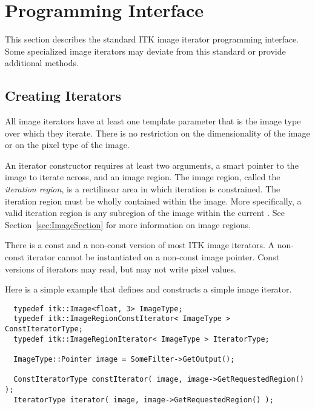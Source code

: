 \section{Programming Interface}
\label{sec:IteratorsInterface}

This section describes the standard ITK image iterator programming interface.
Some specialized image iterators may deviate from this standard or provide
additional methods.

\subsection{Creating Iterators}
\label{sec:CreatingIterators}

All image iterators have at least one template parameter that is the image
type over which they iterate.  There is no restriction on the dimensionality
of the image or on the pixel type of the image.


An iterator constructor requires at least two arguments, a smart pointer to the
image to iterate across, and an image region. The image region, called the
\emph{iteration region}, is a rectilinear area in which iteration is
constrained.  The iteration region must be wholly contained within the image.
More specifically, a valid iteration region is any subregion of the image
within the current .  See Section~\ref{sec:ImageSection}
for more information on image regions.

There is a const and a non-const version of most ITK image iterators. A
non-const iterator cannot be instantiated on a non-const image pointer.
Const versions of iterators may read, but may not write pixel values.

Here is a simple example that defines and constructs a simple image iterator.

\small
\begin{verbatim}
  typedef itk::Image<float, 3> ImageType;
  typedef itk::ImageRegionConstIterator< ImageType > ConstIteratorType;
  typedef itk::ImageRegionIterator< ImageType > IteratorType;

  ImageType::Pointer image = SomeFilter->GetOutput();

  ConstIteratorType constIterator( image, image->GetRequestedRegion() );
  IteratorType iterator( image, image->GetRequestedRegion() );
\end{verbatim}
\normalsize

